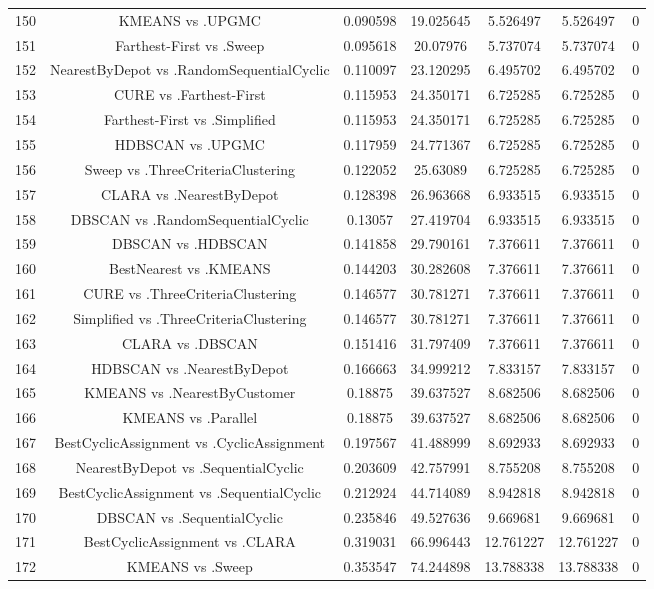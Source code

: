 \documentclass[a4paper,10pt]{article}
\begin{document}
\begin{landscape}
\begin{table}[!htp]
\begin{tabular}{ccccccc}
150&KMEANS vs .UPGMC&0.090598&19.025645&5.526497&5.526497&0\\
151&Farthest-First vs .Sweep&0.095618&20.07976&5.737074&5.737074&0\\
152&NearestByDepot vs .RandomSequentialCyclic&0.110097&23.120295&6.495702&6.495702&0\\
153&CURE vs .Farthest-First&0.115953&24.350171&6.725285&6.725285&0\\
154&Farthest-First vs .Simplified&0.115953&24.350171&6.725285&6.725285&0\\
155&HDBSCAN vs .UPGMC&0.117959&24.771367&6.725285&6.725285&0\\
156&Sweep vs .ThreeCriteriaClustering&0.122052&25.63089&6.725285&6.725285&0\\
157&CLARA vs .NearestByDepot&0.128398&26.963668&6.933515&6.933515&0\\
158&DBSCAN vs .RandomSequentialCyclic&0.13057&27.419704&6.933515&6.933515&0\\
159&DBSCAN vs .HDBSCAN&0.141858&29.790161&7.376611&7.376611&0\\
160&BestNearest vs .KMEANS&0.144203&30.282608&7.376611&7.376611&0\\
161&CURE vs .ThreeCriteriaClustering&0.146577&30.781271&7.376611&7.376611&0\\
162&Simplified vs .ThreeCriteriaClustering&0.146577&30.781271&7.376611&7.376611&0\\
163&CLARA vs .DBSCAN&0.151416&31.797409&7.376611&7.376611&0\\
164&HDBSCAN vs .NearestByDepot&0.166663&34.999212&7.833157&7.833157&0\\
165&KMEANS vs .NearestByCustomer&0.18875&39.637527&8.682506&8.682506&0\\
166&KMEANS vs .Parallel&0.18875&39.637527&8.682506&8.682506&0\\
167&BestCyclicAssignment vs .CyclicAssignment&0.197567&41.488999&8.692933&8.692933&0\\
168&NearestByDepot vs .SequentialCyclic&0.203609&42.757991&8.755208&8.755208&0\\
169&BestCyclicAssignment vs .SequentialCyclic&0.212924&44.714089&8.942818&8.942818&0\\
170&DBSCAN vs .SequentialCyclic&0.235846&49.527636&9.669681&9.669681&0\\
171&BestCyclicAssignment vs .CLARA&0.319031&66.996443&12.761227&12.761227&0\\
172&KMEANS vs .Sweep&0.353547&74.244898&13.788338&13.788338&0\\

\end{tabular}
\end{table}
\end{landscape}
\end{document}
